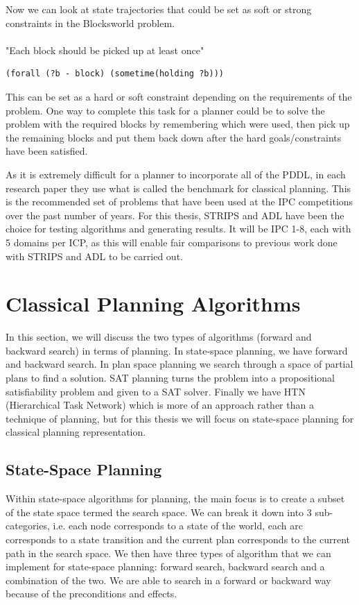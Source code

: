 Now we can look at state trajectories that could be set as soft or strong constraints in the Blocksworld problem.
\\
\\
"Each block should be picked up at least once" 
\begin{verbatim}
(forall (?b - block) (sometime(holding ?b)))
\end{verbatim}\cite{PDDL3} 
This can be set as a hard or soft constraint depending on the requirements of the problem. One way to complete this task for a planner could be to solve the problem with the required blocks by remembering which were used, then pick up the remaining blocks and put them back down after the hard goals/constraints have been satisfied. 

As it is extremely difficult for a planner to incorporate all of the PDDL, in each research paper they use what is called the benchmark for classical planning. This is the recommended set of problems that have been used at the IPC competitions over the past number of years\cite{ICAPS}. For this thesis, STRIPS and ADL have been the choice for testing algorithms and generating results. It will be IPC 1-8, each with 5 domains per ICP, as this will enable fair comparisons to previous work done with STRIPS and ADL to be carried out. 
\section{Classical Planning Algorithms}
In this section, we will discuss the two types of algorithms (forward and backward search) in terms of planning. In state-space planning, we have forward and backward search. In plan space planning we search through a space of partial plans to find a solution. SAT planning turns the problem into a propositional satisfiability problem and given to a SAT solver. Finally we have HTN (Hierarchical Task Network) which is more of an approach rather than a technique of planning, but for this thesis we will focus on state-space planning for classical planning representation. 
\subsection{State-Space Planning}
Within state-space algorithms for planning, the main focus is to create a subset of the state space termed the search space. We can break it down into 3 sub-categories, i.e. each node corresponds to a state of the world, each arc corresponds to a state transition and the current plan corresponds to the current path in the search space\cite{PlanningBook}. We then have three types of algorithm that we can implement for state-space planning: forward search, backward search and a combination of the two. We are able to search in a forward or backward way because of the preconditions and effects. 
